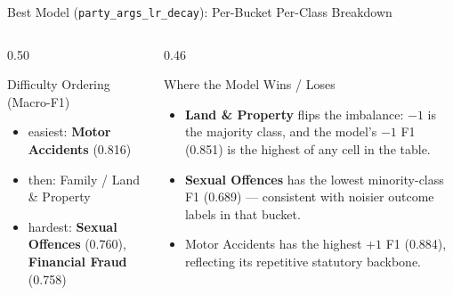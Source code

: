 \documentclass[aspectratio=169,11pt]{beamer}
\newenvironment{tightitemize}{
  \begin{itemize}
    \setlength{\itemsep}{2pt}
    \setlength{\parskip}{0pt}
}{\end{itemize}}
\newcommand{\highlight}[1]{\textcolor{ThesisBlue}{\textbf{#1}}}
\begin{document}
\begin{frame}{Best Model (\texttt{party\_args\_lr\_decay}): Per-Bucket Per-Class Breakdown}
  \vspace{0.6em}
  \begin{columns}[T]
    \begin{column}{0.50\textwidth}
      \begin{block}{Difficulty Ordering (Macro-F1)}
        \begin{tightitemize}
          \item easiest: \highlight{Motor Accidents} (0.816)
          \item then: Family / Land \& Property
          \item hardest: \highlight{Sexual Offences} (0.760), \highlight{Financial Fraud} (0.758)
        \end{tightitemize}
      \end{block}
    \end{column}
    \begin{column}{0.46\textwidth}
      \begin{block}{Where the Model Wins / Loses}
        \begin{tightitemize}
          \item \highlight{Land \& Property} flips the imbalance: $-1$ is the majority class, and the model's $-1$ F1 (0.851) is the highest of any cell in the table.
          \item \highlight{Sexual Offences} has the lowest minority-class F1 (0.689) --- consistent with noisier outcome labels in that bucket.
          \item Motor Accidents has the highest $+1$ F1 (0.884), reflecting its repetitive statutory backbone.
        \end{tightitemize}
      \end{block}
    \end{column}
  \end{columns}
\end{frame}
\end{document}
